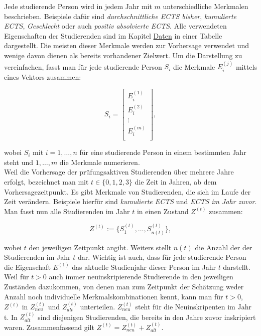 Jede studierende Person wird in jedem Jahr mit $m$ unterschiedliche Merkmalen beschrieben. Beispiele daf\"ur sind \textit{\glqq durchschnittliche ECTS bisher\grqq{}},
\textit{\glqq kumulierte ECTS\grqq{}}, \textit{\glqq Geschlecht\grqq{}} oder auch \textit{\glqq positiv absolvierte ECTS\grqq{}}. Alle verwendeten Eigenschaften der
Studierenden sind im Kapitel \hyperref[sec:daten]{Daten} in einer Tabelle dargestellt. Die meisten dieser Merkmale werden zur
Vorhersage verwendet und wenige davon dienen als bereits vorhandener Zielwert. Um die Darstellung zu vereinfachen, fasst man f\"ur
jede studierende Person $S_i$ die Merkmale $E_i^{(j)}$ mittels eines Vektors zusammen:

$$S_i = \begin{bmatrix}
		E_i^{(1)} \\
		E_i^{(2)} \\
		\vdots    \\
		E_i^{(m)} \\
	\end{bmatrix}, $$

wobei $S_i$ mit $i = 1,\dots,n$ f\"ur eine studierende Person in einem bestimmten Jahr steht und $1,\dots,m$ die Merkmale numerieren. \\

Weil die Vorhersage der pr\"ufungsaktiven Studierenden \"uber mehrere Jahre erfolgt, bezeichnet man
mit $t \in \{0,1,2,3\}$ die Zeit in Jahren, ab dem Vorhersagezeitpunkt. Es gibt Merkmale von Studierenden, die sich im Laufe der Zeit
ver\"andern. Beispiele hierf\"ur sind \textit{\glqq kumulierte ECTS\grqq{}} und \textit{\glqq ECTS im Jahr zuvor\grqq{}}. Man fasst nun alle
Studierenden im Jahr $t$ in einen Zustand $Z^{(t)}$ zusammen:

$$Z^{(t)} := \{S_1^{(t)}, \dots ,S_{n(t)}^{(t)}\},$$

wobei $t$ den jeweiligen Zeitpunkt angibt. Weiters stellt $n(t)$ die Anzahl der der Studierenden im
Jahr $t$ dar. Wichtig ist auch, dass f\"ur jede studierende Person die Eigenschaft $E^{(1)}$ das aktuelle Studienjahr
dieser Person im Jahr $t$ darstellt. \\



Weil für $t>0$ auch immer neuinskripierende Studierende in den jeweiligen Zuständen dazukommen, von denen man zum Zeitpunkt der Sch\"atzung weder
Anzahl noch individuelle Merkmalskombinationen kennt, kann man für $t>0$, $Z^{(t)}$ in $Z_{neu}^{(t)}$ und $Z_{alt}^{(t)}$ unterteilen.
$Z_{neu}^{(t)}$ steht f\"ur die Neuinskripenten im Jahr t.
In $Z_{alt}^{(t)}$ sind diejenigen Studierenden, die bereits in den Jahre zuvor inskripiert waren.
Zusammenfassend gilt $Z^{(t)} = Z_{neu}^{(t)} + Z_{alt}^{(t)}$.  \\

